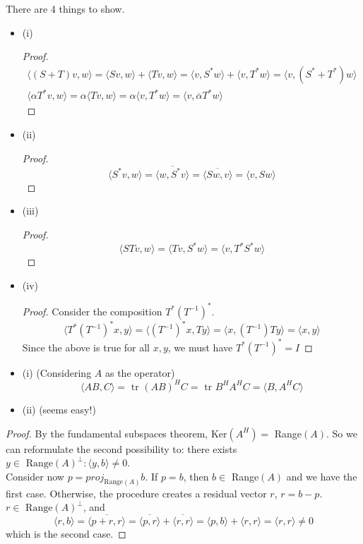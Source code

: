 \documentclass[12pt]{article}
\newenvironment{problem}[2][Problem]{\begin{trivlist}
\item[\hskip \labelsep {\bfseries #1}\hskip \labelsep {\bfseries #2.}]}{\end{trivlist}}
\theoremstyle{definition}
\theoremstyle{definition}
\theoremstyle{definition}
\theoremstyle{definition}
\begin{document}
\begin{problem}{3.39}
There are 4 things to show.
\begin{itemize}
\item (i)
\begin{proof}
\begin{align*}
\langle (S+T) v, w \rangle = \langle Sv, w \rangle + \langle Tv, w \rangle = \langle v, S^*w \rangle + \langle v, T^*w \rangle = \langle v, (S^* + T^*)w \rangle \\
\langle \alpha T^*v, w \rangle = \alpha \langle Tv, w \rangle= \alpha \langle v, T^*w \rangle = \langle v, \overline{\alpha}T^*w \rangle
\end{align*}
\end{proof}
\item (ii)
\begin{proof}
$$ \langle S^*v, w \rangle = \overline{\langle w, S^*v \rangle} = \overline{\langle Sw, v \rangle} = \langle v, Sw \rangle $$
\end{proof}
\item (iii)
\begin{proof}
$$\langle STv, w \rangle = \langle Tv, S^*w \rangle = \langle v, T^*S^*w \rangle$$
\end{proof}
\item (iv)
\begin{proof}
Consider the composition $T^*(T^{-1})^*$. 
$$
\langle 
T^*(T^{-1})^*x, y \rangle = \langle (T^{-1})^*x, Ty \rangle= \langle x, (T^{-1})Ty \rangle = \langle x, y \rangle
$$
Since the above is true for all $x, y$, we must have $T^*(T^{-1})^* = I $ 
\end{proof}
\end{itemize}
\end{problem}

\begin{problem}{3.40}
\end{problem}
\begin{itemize}
\item (i) (Considering $A$ as the operator)
$$
\langle AB, C \rangle = \text{ tr }(AB)^HC = \text{ tr } B^HA^HC = \langle B, A^HC \rangle
$$
\item (ii) (seems easy!)
\end{itemize}

\begin{problem}{3.44}
\begin{proof}
 By the fundamental subspaces theorem, Ker$(A^H) =$ Range$(A)$. So we can reformulate the second possibility to: there exists $y \in \text{ Range}(A)^\perp : \langle y, b \rangle \neq 0 $. \\
 Consider now $p = proj_{\text{Range}(A)}b$. If $p = b$, then $b \in$ Range$(A)$ and we have the first case. Otherwise, the procedure creates a residual vector $r$, $r = b - p$. $r \in \text{ Range}(A)^\perp$, and 
$$\langle r, b \rangle = \overline{\langle p + r, r \rangle} = \overline{\langle p, r \rangle} + \overline{\langle r, r \rangle} = \langle p, b \rangle + \langle r, r \rangle = \langle r, r \rangle \neq 0$$
which is the second case. 
\end{proof}
\end{problem}
\end{document}
